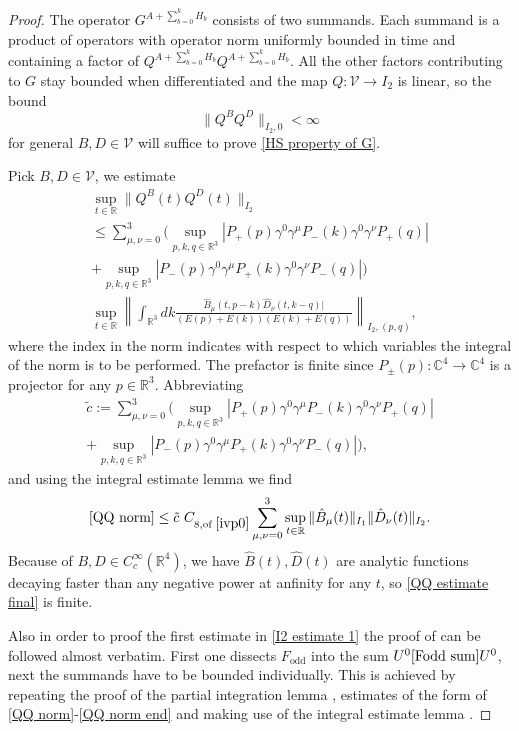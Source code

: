 \documentclass[b5paper,draft,openbib,12pt]{memoir}
\DeclareMathOperator{\odd}{odd}
\begin{document}
\begin{proof}
The operator \(G^{A+\sum_{b=0}^k H_b}\) consists of 
two summands. Each summand is a product of operators 
with operator norm uniformly bounded in time and
containing a factor of 
\(Q^{A+\sum_{b=0}^k H_b} Q^{A+\sum_{b=0}^k H_b}\).
All the other factors contributing to \(G\)
stay bounded when differentiated and
the map \(Q:\mathcal{V}\rightarrow I_2\) is 
linear, so the bound 
\begin{equation}
\|Q^{B} Q^{D}\|_{I_2,0}<\infty
\end{equation}
for general \(B,D\in\mathcal{V}\) will suffice to prove
\eqref{HS property of G}. 


Pick \(B,D\in\mathcal{V}\), we estimate 
\begin{align}\label{QQ norm}
\sup_{t\in \mathbb{R}}\| Q^B (t) Q^D(t)\|_{I_2}\\
\le \sum_{\mu,\nu=0}^3 
\big(\sup_{p,k,q\in\mathbb{R}^3} 
|P_+(p)\gamma^0\gamma^\mu P_-(k)\gamma^0\gamma^\nu P_+(q)|\\
+\sup_{p,k,q\in\mathbb{R}^3} 
|P_-(p)\gamma^0\gamma^\mu P_+(k)\gamma^0\gamma^\nu P_-(q)|\big)\\\label{QQ norm end}
\sup_{t\in\mathbb{R}}\left\| \int_{\mathbb{R}^3} dk 
\frac{\hat{B}_\mu (t,p-k)\hat{D}_\nu(t,k-q)|}{(E(p)+E(k))(E(k)+E(q))} 
\right\|_{I_2,(p,q)},
\end{align}
where the index in the norm indicates 
with respect to which variables the integral of the norm 
is to be performed. The prefactor is finite since 
\(P_\pm (p):\mathbb{C}^4\rightarrow\mathbb{C}^4\) 
is a projector for any \(p\in\mathbb{R}^3\).
Abbreviating 
\begin{align}
\tilde{c}:=\sum_{\mu,\nu=0}^3 
(\sup_{p,k,q\in\mathbb{R}^3} 
|P_+(p)\gamma^0\gamma^\mu P_-(k)\gamma^0\gamma^\nu P_+(q)|\\
+\sup_{p,k,q\in\mathbb{R}^3} 
|P_-(p)\gamma^0\gamma^\mu P_+(k)\gamma^0\gamma^\nu P_-(q)|),
\end{align}
and using the integral estimate lemma 
\cite[lemma 3.8 (iii)]{ivp0} we find
\begin{align}\label{QQ estimate final}
\eqref{QQ norm}\le 
\tilde{c}~ C_{8,\text{of }\cite{ivp0}} \sum_{\mu,\nu=0}^3 
\sup_{t\in\mathbb{R}}\|\hat{B}_\mu(t) \|_{I_1} \|\hat{D}_{\nu}(t) \|_{I_2}.
\end{align}
Because of 
\(B,D\in C_c^\infty(\mathbb{R}^4)\), we have
\(\hat{B}(t),\hat{D}(t)\) are analytic functions
decaying faster than any negative power at anfinity
for any \(t\), so \eqref{QQ estimate final} is finite. 

Also in order to proof the first estimate in 
\eqref{I2 estimate 1} the proof of \cite[lemma 3.7]{ivp0}
can be followed almost verbatim. 
First one dissects \(F_{\odd}\) into the sum 
\(U^0\eqref{Fodd sum}U^0\),
next the summands have to be bounded individually.
This is achieved by repeating the proof of the
partial integration lemma \cite[lemma 3.6]{ivp0},
estimates of the form of \eqref{QQ norm}-\eqref{QQ norm end}
and making use of the integral estimate lemma 
\cite[lemma 3.8]{ivp0}.

\end{proof}
\end{document}
